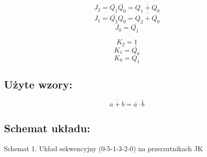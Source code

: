\documentclass[12pt,a4paper]{article}
\begin{document}
			\begin{minipage}{.5\textwidth}
				
				\begin{displaymath}
					J_2 = \bar{Q_1}\bar{Q_0} = \overline{Q_1 + Q_0}
				\end{displaymath}
				\begin{displaymath}
					J_1 = \bar{Q_2}Q_0 = \overline{Q_2 + \overline{Q_0}}
				\end{displaymath}
				\begin{displaymath}
					J_0 = \bar{Q_1}
				\end{displaymath}
				
			\end{minipage}%
			\begin{minipage}{.5\textwidth}
				
				\begin{displaymath}
					K_2 = 1
				\end{displaymath}
				\begin{displaymath}
					K_1 = \bar{Q_0}
				\end{displaymath}
				\begin{displaymath}
					K_0 = Q_1
				\end{displaymath}
				
			\end{minipage}
			
		\subsection{Użyte wzory:}
		
			\begin{equation}
			\overline{a+b}=\bar{a}\cdot\bar{b}
			\end{equation}
	
		\subsection{Schemat układu:}
		
			\vspace{1.5cm}
			\begin{center}
				Schemat 1. Układ sekwencyjny (0-5-1-3-2-0) na przerzutnikach JK
			\end{center}
	
\end{document}
